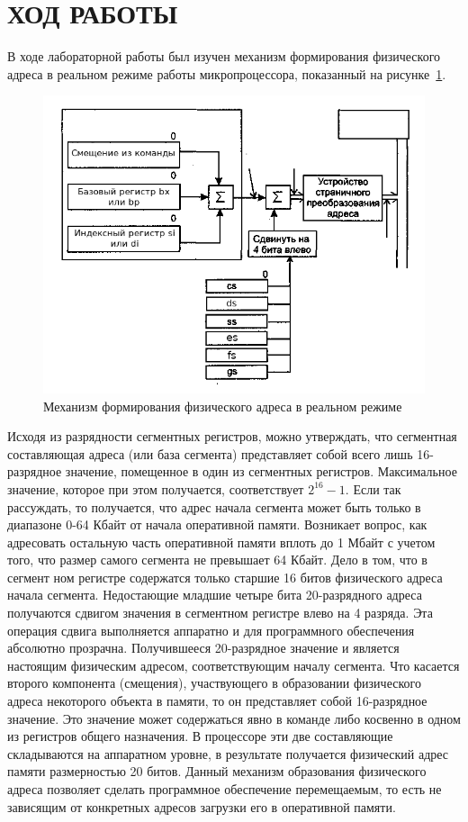 \section{ХОД РАБОТЫ}

В ходе лабораторной работы был изучен механизм формирования физического адреса в 
реальном режиме работы микропроцессора, показанный на рисунке~\ref{fig:physical_address}.

\begin{figure}[htbp]
  \centering
  \includegraphics[width=150mm]{pic/physical_address}
  \caption{Механизм формирования физического адреса в реальном режиме}\label{fig:physical_address}
\end{figure}

Исходя из разрядности сегментных регистров, можно утверждать,
что сегментная составляющая адреса (или база сегмента) представляет собой всего
лишь 16-разрядное значение, помещенное в один из сегментных регистров.
Максимальное значение, которое при этом получается, соответствует $ 2^{16} - 1 $.
Если так рассуждать, то получается, что адрес начала сегмента может быть
только в диапазоне 0-64 Кбайт от начала оперативной памяти. Возникает вопрос,
как адресовать остальную часть оперативной памяти вплоть до 1 Мбайт с учетом
того, что размер самого сегмента не превышает 64 Кбайт. Дело в том, что в сегмент
ном регистре содержатся только старшие 16 битов физического адреса начала сегмента.
Недостающие младшие четыре бита 20-разрядного адреса получаются сдвигом значения в
сегментном регистре влево на 4 разряда. Эта операция сдвига
выполняется аппаратно и для программного обеспечения абсолютно прозрачна.
Получившееся 20-разрядное значение и является настоящим физическим адресом,
соответствующим началу сегмента. Что касается второго компонента (смещения),
участвующего в образовании физического адреса некоторого объекта в памяти,
то он представляет собой 16-разрядное значение. Это значение может
содержаться явно в команде либо косвенно в одном из регистров общего назначения.
В процессоре эти две составляющие складываются на аппаратном уровне,
в результате получается физический адрес памяти размерностью 20 битов.
Данный механизм образования физического адреса позволяет сделать программное
обеспечение перемещаемым, то есть не зависящим от конкретных адресов
загрузки его в оперативной памяти.

